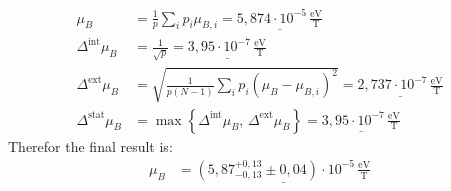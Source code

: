 \documentclass[a4paper,12pt]{article}
\newcommand{\kla}{}
\newcommand{\klammer}{}
\newcommand{\tecxt}{}
\begin{document}
\begin{align*}
\mu_B&=\frac{1}{p}\sum_ip_i\mu_{B,i}=\underline{5,874\cdot 10^{-5}\,\frac{\tecxt\text{eV}}{\tecxt\text{T}}}\\
\Delta^\tecxt\text{int}\mu_B&=\frac{1}{\sqrt{p}}=\underline{3,95\cdot 10^{-7}\,\frac{\tecxt\text{eV}}{\tecxt\text{T}}}\\
\Delta^\tecxt\text{ext}\mu_B&=\sqrt{\frac{1}{p(N-1)}\sum_ip_i\kla\left( {\mu_B-\mu_{B,i}} \right)^2}=\underline{2,737\cdot 10^{-7}\,\frac{\tecxt\text{eV}}{\tecxt\text{T}}}\\
\Delta^\tecxt\text{stat}\mu_B&=\max\klammer\left\{{\Delta^\tecxt\text{int}\mu_B,\,\Delta^\tecxt\text{ext}\mu_B} \right\}=\underline{3,95\cdot 10^{-7}\,\frac{\tecxt\text{eV}}{\tecxt\text{T}}}
\end{align*}
Therefor the final result is:
\begin{align*}
\mu_B&=\underline{\kla\left( {5,87_{-0,13}^{+0,13}\pm 0,04} \right)\cdot 10^{-5}\,\frac{\tecxt\text{eV}}{\tecxt\text{T}}}
\end{align*}
\end{document}
